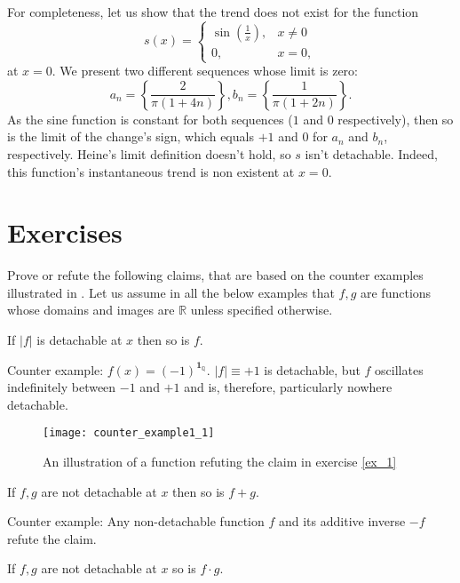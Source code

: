 \documentclass[11pt]{book}
\begin{document}
\begin{remark}For completeness, let us show that the trend does not exist for the function $$s\left(x\right)=\begin{cases}
\sin\left(\frac{1}{x}\right), & x\neq0\\
0, & x=0,
\end{cases}$$
at $x=0$. We present two different sequences whose limit is zero: $$a_{n}=\left\{ \frac{2}{\pi\left(1+4n\right)}\right\} ,b_{n}=\left\{ \frac{1}{\pi\left(1+2n\right)}\right\}.$$
As the sine function is constant for both sequences ($1$ and $0$ respectively), then so is the limit of the change’s sign, which equals $+1$ and $0$ for $a_{n}$ and $b_{n}$, respectively. Heine’s limit definition doesn’t hold, so $s$ isn’t detachable. Indeed, this function’s instantaneous trend is non existent at $x=0$.
\end{remark}

\section{Exercises}
Prove or refute the following claims, that are based on
the counter examples illustrated in \cite{klymchuk2010counterexamples}. Let us assume in all the below
examples that $f,g$ are functions whose domains and images are $\mathbb{R}$
unless specified otherwise.

\begin{exercise}\label{ex_1}
If $\left|f\right|$ is detachable at $x$ then so is $f$.
\end{exercise}

Counter example: $f\left(x\right)=\left(-1\right)^{\boldsymbol{1}_{\mathbb{Q}}}$.
$\left|f\right|\equiv+1$ is detachable, but $f$ oscillates indefinitely
between $-1$ and $+1$ and is, therefore, particularly nowhere detachable.

\begin{figure}[h!]
\texttt{[image: counter\_example1\_1]}
\caption{An illustration of a function refuting the claim in exercise \ref{ex_1}}
\label{minus_one_in_irrationals}
\end{figure}

\begin{exercise}If $f,g$ are not detachable at $x$ then so is $f+g$.
\end{exercise}

Counter example: Any non-detachable function $f$ and its additive
inverse $-f$ refute the claim.

\begin{exercise}If $f,g$ are not detachable at $x$ so is $f\cdot g$.
\end{exercise}
\end{document}
